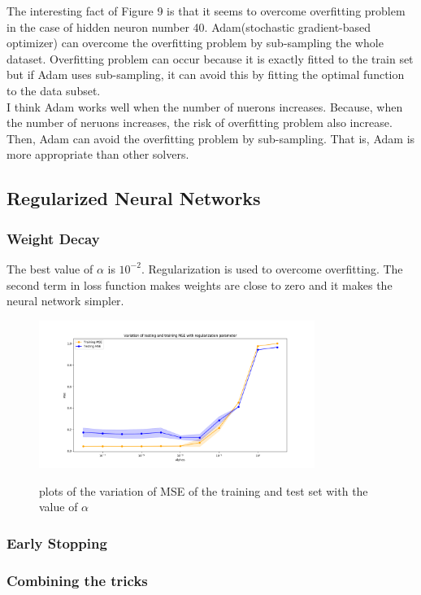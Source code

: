 \documentclass[a4paper]{article}
\begin{document}
The interesting fact of Figure 9 is that it seems to overcome overfitting problem in the case of hidden neuron number 40. Adam(stochastic gradient-based optimizer) can overcome the overfitting problem by sub-sampling the whole dataset. Overfitting problem can occur because it is exactly fitted to the train set but if Adam uses sub-sampling, it can avoid this by fitting the optimal function to the data subset.\\
I think Adam works well when the number of nuerons increases. Because, when the number of neruons increases, the risk of overfitting problem also increase. Then, Adam can avoid the overfitting problem by sub-sampling. That is, Adam is more appropriate than other solvers.
\subsection{Regularized Neural Networks}
\subsubsection{Weight Decay}
The best value of $\alpha$ is $10^{-2}$. Regularization is used to overcome
overfitting. The second term in loss function makes weights are close to
zero and it makes the neural network simpler.
\begin{figure}[h]
  \begin{center}
  \includegraphics[width=0.8\textwidth]{ex_1_2_a.png}\\
  \caption{plots of the variation of MSE of the training and test set with the value of $\alpha$}
  \end{center}
\end{figure}
\subsubsection{Early Stopping}
\subsubsection{Combining the tricks}
\end{document}
